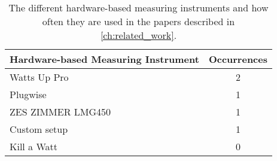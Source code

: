 \begin{table}[ht]
    \centering
    \begin{tabular}{| l | c |}
    \hline
    \textbf{Hardware-based Measuring Instrument}  & \textbf{Occurrences}                    \\ \hline
    Watts Up Pro        & 2      \\ \hline
    Plugwise            & 1      \\ \hline
    ZES ZIMMER LMG450   & 1      \\ \hline
    Custom setup        & 1      \\ \hline
    Kill a Watt         & 0      \\ \hline
    \end{tabular}
    \caption{The different hardware-based measuring instruments and how often they are used in the papers described in \cref{ch:related_work}.}
    \label{tab:Hardware_based_Measuring_instruments}
    \end{table}